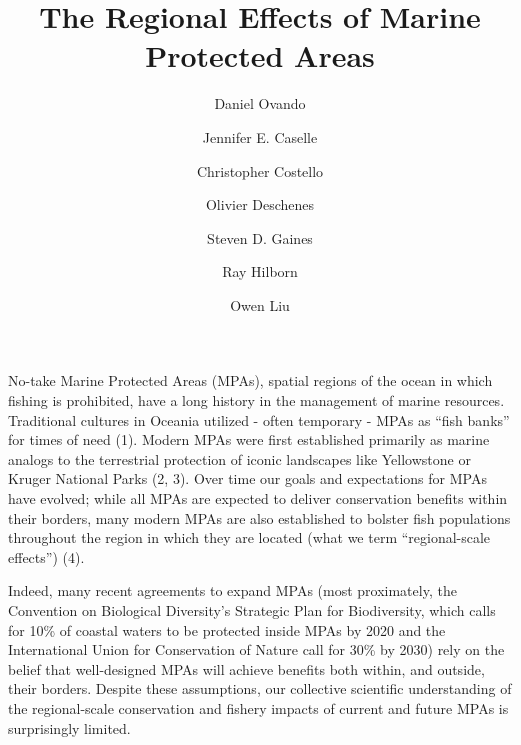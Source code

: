 \documentclass[9pt,twocolumn,twoside,lineno]{pnas-new}
\title{The Regional Effects of Marine Protected Areas}
\author[a,1]{Daniel Ovando}
\author[b]{Jennifer E. Caselle}
\author[b]{Christopher Costello}
\author[b]{Olivier Deschenes}
\author[b]{Steven D. Gaines}
\author[a]{Ray Hilborn}
\author[b]{Owen Liu}
\affil[a]{University of Washington, School of Aquatic and Fishery Science}
\affil[b]{University of California, Santa Barbara}
\begin{document}
\verticaladjustment{-2pt}

\maketitle
\thispagestyle{firststyle}




No-take Marine Protected Areas (MPAs), spatial regions of the ocean in
which fishing is prohibited, have a long history in the management of
marine resources. Traditional cultures in Oceania utilized - often
temporary - MPAs as ``fish banks'' for times of need (1). Modern MPAs
were first established primarily as marine analogs to the terrestrial
protection of iconic landscapes like Yellowstone or Kruger National
Parks (2, 3). Over time our goals and expectations for MPAs have
evolved; while all MPAs are expected to deliver conservation benefits
within their borders, many modern MPAs are also established to bolster
fish populations throughout the region in which they are located (what
we term ``regional-scale effects'') (4).

Indeed, many recent agreements to expand MPAs (most proximately, the
Convention on Biological Diversity's Strategic Plan for Biodiversity,
which calls for 10\% of coastal waters to be protected inside MPAs by
2020 and the International Union for Conservation of Nature call for
30\% by 2030) rely on the belief that well-designed MPAs will achieve
benefits both within, and outside, their borders. Despite these
assumptions, our collective scientific understanding of the
regional-scale conservation and fishery impacts of current and future
MPAs is surprisingly limited.
\end{document}
